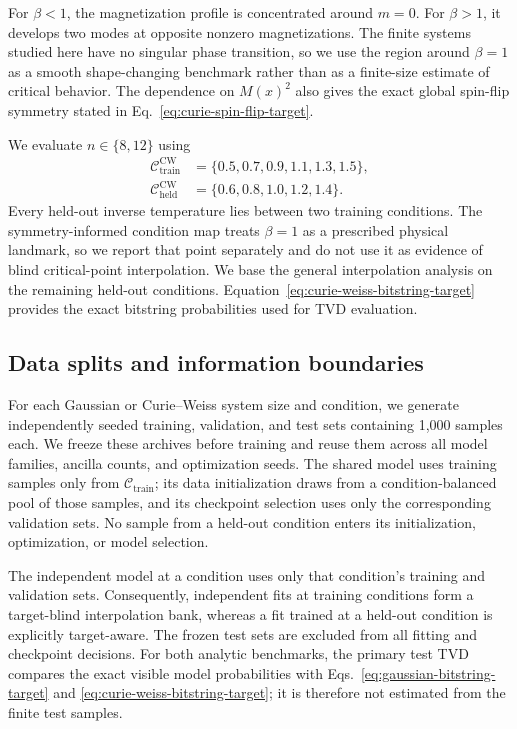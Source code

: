 \documentclass[pra,aps,10pt,twocolumn,floatfix,superscriptaddress,
notitlepage,longbibliography]{revtex4-2}
\begin{document}
For $\beta<1$, the magnetization profile is concentrated around $m=0$. For $\beta>1$, it develops two modes at opposite nonzero magnetizations. The finite systems studied here have no singular phase transition, so we use the region around $\beta=1$ as a smooth shape-changing benchmark rather than as a finite-size estimate of critical behavior. The dependence on $M(x)^2$ also gives the exact global spin-flip symmetry stated in Eq.~\eqref{eq:curie-spin-flip-target}.

We evaluate $n\in\{8,12\}$ using
\begin{align}
    \mathcal C_{\mathrm{train}}^{\mathrm{CW}}
    &=\{0.5,0.7,0.9,1.1,1.3,1.5\},\\
    \mathcal C_{\mathrm{held}}^{\mathrm{CW}}
    &=\{0.6,0.8,1.0,1.2,1.4\}.
    \label{eq:curie-weiss-condition-sets}
\end{align}
Every held-out inverse temperature lies between two training conditions. The symmetry-informed condition map treats $\beta=1$ as a prescribed physical landmark, so we report that point separately and do not use it as evidence of blind critical-point interpolation. We base the general interpolation analysis on the remaining held-out conditions. Equation~\eqref{eq:curie-weiss-bitstring-target} provides the exact bitstring probabilities used for TVD evaluation.

\subsection{Data splits and information boundaries}

For each Gaussian or Curie--Weiss system size and condition, we generate independently seeded training, validation, and test sets containing 1,000 samples each. We freeze these archives before training and reuse them across all model families, ancilla counts, and optimization seeds. The shared model uses training samples only from $\mathcal C_{\mathrm{train}}$; its data initialization draws from a condition-balanced pool of those samples, and its checkpoint selection uses only the corresponding validation sets. No sample from a held-out condition enters its initialization, optimization, or model selection.

The independent model at a condition uses only that condition's training and validation sets. Consequently, independent fits at training conditions form a target-blind interpolation bank, whereas a fit trained at a held-out condition is explicitly target-aware. The frozen test sets are excluded from all fitting and checkpoint decisions. For both analytic benchmarks, the primary test TVD compares the exact visible model probabilities with Eqs.~\eqref{eq:gaussian-bitstring-target} and \eqref{eq:curie-weiss-bitstring-target}; it is therefore not estimated from the finite test samples.
\end{document}
